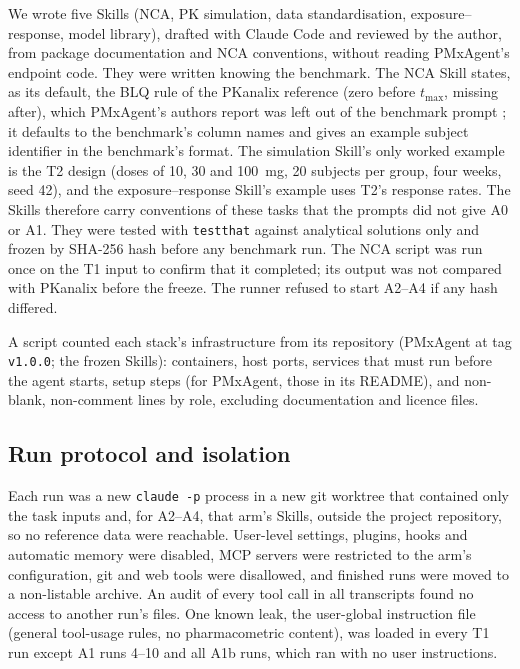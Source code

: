 \documentclass[11pt]{article}
\begin{document}
We wrote five Skills (NCA, PK simulation, data standardisation, exposure--response, model library), drafted with Claude
Code and reviewed by the author, from package documentation and NCA conventions, without reading PMxAgent's endpoint
code. They were written knowing the benchmark. The NCA Skill states, as its default, the BLQ rule of the PKanalix
reference (zero before $t_\mathrm{max}$, missing after), which PMxAgent's authors report was left out of the benchmark
prompt \cite{bloomingdale2026pmxagent}; it defaults to the benchmark's column names and gives an example subject
identifier in the benchmark's format. The simulation Skill's only worked example is the T2 design (doses of 10, 30 and
100~mg, 20 subjects per group, four weeks, seed 42), and the exposure--response Skill's example uses T2's response
rates. The Skills therefore carry conventions of these tasks that the prompts did not give A0 or A1. They were tested
with \texttt{testthat} against analytical solutions only and frozen by SHA-256 hash before any benchmark run. The NCA
script was run once on the T1 input to confirm that it completed; its output was not compared with PKanalix before the
freeze. The runner refused to start A2--A4 if any hash differed.

A script counted each stack's infrastructure from its repository (PMxAgent at tag \texttt{v1.0.0}; the frozen
Skills): containers, host ports, services that must run before the agent starts, setup steps (for PMxAgent, those in
its README), and non-blank, non-comment lines by role, excluding documentation and licence files.

\subsection{Run protocol and isolation}
Each run was a new \texttt{claude -p} process in a new git worktree that contained only the task inputs and, for
A2--A4, that arm's Skills, outside the project repository, so no reference data were reachable. User-level settings,
plugins, hooks and automatic memory were disabled, MCP servers were restricted to the arm's configuration, git and web
tools were disallowed, and finished runs were moved to a non-listable archive. An audit of every tool call in all
transcripts found no access to another run's files. One known leak, the user-global
instruction file (general tool-usage rules, no pharmacometric content), was loaded in every T1 run except A1 runs 4--10
and all A1b runs, which ran with no user instructions.
\end{document}
